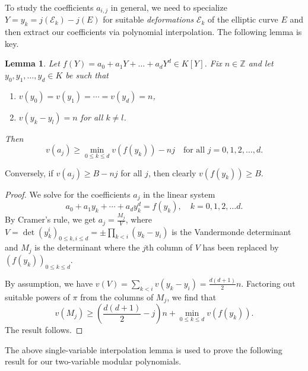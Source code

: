 \documentclass[11pt]{amsart}
\newtheorem{lemma}[prop]{Lemma}
\theoremstyle{definition}
\def\BZ{\mathbb{Z}}
\def\CE{\mathcal{E}}
\begin{document}
To study the coefficients $a_{i,j}$ in general, we need to specialize $Y=y_k=j(\CE_k) - j(E)$ for suitable {\em deformations} $\CE_k$ of the elliptic curve $E$ and then extract our coefficients via polynomial interpolation. The following lemma is key. 

\begin{lemma}\label{lem:interpolation}
    Let $f(Y) = a_0 + a_1Y + \ldots + a_dY^d \in K[Y]$.
    Fix $n\in\BZ$ and
    let $y_0, y_1,\ldots, y_d\in K$ be such that
    \begin{enumerate}
        \item $v(y_0)=v(y_1)=\cdots=v(y_d)=n$,
        \item $v(y_k-y_l) = n$ for all $k\neq l$.
    \end{enumerate}
    Then 
    \[
    v(a_j)  \geq \min_{0\leq k \leq d} v(f(y_k)) - nj
    \quad \text{for all $j=0,1,2,\ldots, d$}.
    \]
\end{lemma}

Conversely, if $v(a_j) \geq B - nj$ for all $j$, then clearly $v(f(y_k)) \geq B$.

\begin{proof}
    We solve for the coefficients $a_j$ in the linear system
    \[
    a_0 + a_1y_k + \cdots + a_dy_k^d = f(y_k), \quad k=0,1,2,\ldots d.
    \]
    By Cramer's rule, we get $a_j = \frac{M_j}{V}$, where $V = \det(y_k^i)_{0\leq k,i \leq d} = \pm\prod_{k<i}(y_k-y_i)$ is the Vandermonde determinant and $M_j$ is the determinant where the $j$th column of $V$ has been replaced by $(f(y_k))_{0\leq k\leq d}$.

    By assumption, we have $v(V) = \sum_{k<i}v(y_k-y_i) = \frac{d(d+1)}{2}n$.
    Factoring out suitable powers of $\pi$ from the columns of $M_j$, we find that
    \[
    v(M_j) \geq  \left( \frac{d(d+1)}{2} - j\right)n + \min_{0\leq k \leq d} v(f(y_k)).
    \]
    The result follows.
\end{proof}

The above single-variable interpolation lemma is used to prove the following result for our two-variable modular polynomials.
\end{document}
